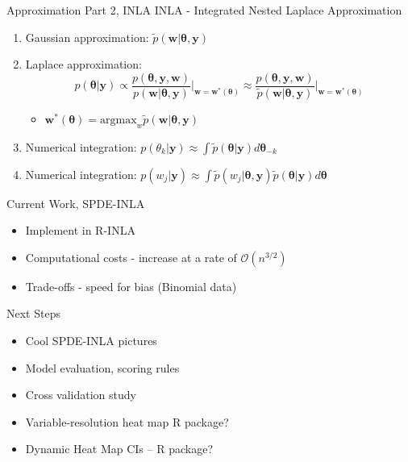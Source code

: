 \documentclass{beamer}
\begin{document}
\begin{frame}{Approximation Part 2, INLA}
INLA - Integrated Nested Laplace Approximation \citep{Rue2009} \\ 

        \begin{enumerate}
        \addtolength{\itemsep}{0.5\baselineskip}
        \item Gaussian approximation: $\tilde{p}(\pmb{w}|\pmb{\theta, y})$
        \item Laplace approximation:
        $$ p(\pmb{\theta} | \pmb{y}) \propto \frac{p(\pmb{\theta, y, w})}{p(\pmb{w}|\pmb{\theta, y})} \Big|_{\pmb{w} = \pmb{w}^{*}(\pmb{\theta})} \approx \frac{p(\pmb{\theta, y, w})}{\tilde{p}(\pmb{w}|\pmb{\theta, y})} \Big|_{\pmb{w} = \pmb{w}^{*}(\pmb{\theta})}$$
        \begin{itemize}
        \item $\pmb{w}^{*}(\pmb{\theta}) = \text{argmax}_{w}\tilde{p}(\pmb{w}|\pmb{\theta, y})$
        \end{itemize}
        \item Numerical integration: 
        $ p(\theta_{k} | \pmb{y}) \approx \int \tilde{p}(\pmb{\theta}|\pmb{y}) d\pmb{\theta}_{-k} $
        \item Numerical integration: 
        $ p(w_{j} | \pmb{y}) \approx \int \tilde{p}(w_{j}|\pmb{\theta, y})\tilde{p}(\pmb{\theta}|\pmb{y}) d\pmb{\theta} $
        \end{enumerate}
\end{frame}

\begin{frame}{Current Work, SPDE-INLA}
\begin{itemize}
\addtolength{\itemsep}{0.5\baselineskip}
\item Implement in R-INLA \citep{Lindgren2015}
\item Computational costs - increase at a rate of $\mathcal{O}(n^{3/2})$
\item Trade-offs - speed for bias (Binomial data)
\end{itemize}
\end{frame}

\begin{frame}{Next Steps}
\begin{itemize}
\addtolength{\itemsep}{0.5\baselineskip}
\item Cool SPDE-INLA pictures
\item Model evaluation, scoring rules \citep{Bickel2007}
\item Cross validation study
\item Variable-resolution heat map R package?
\item Dynamic Heat Map CIs -- R package?
\end{itemize}
\end{frame}
\end{document}
